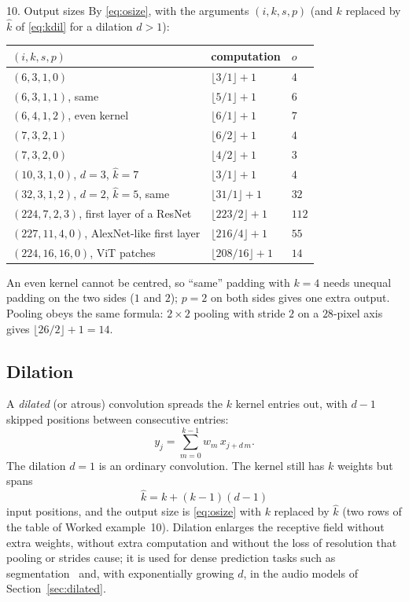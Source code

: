\documentclass[11pt]{article}
\begin{document}
\begin{worked}{10. Output sizes}
By \eqref{eq:osize}, with the arguments $(i, k, s, p)$ (and $k$ replaced by $\hat k$ of \eqref{eq:kdil} for a dilation
$d > 1$):
\begin{center}\small
\begin{tabular}{@{}lll@{}}
\toprule
$(i, k, s, p)$ & computation & $o$ \\
\midrule
$(6, 3, 1, 0)$ & $\lfloor 3/1 \rfloor + 1$ & $4$ \\
$(6, 3, 1, 1)$, same & $\lfloor 5/1 \rfloor + 1$ & $6$ \\
$(6, 4, 1, 2)$, even kernel & $\lfloor 6/1 \rfloor + 1$ & $7$ \\
$(7, 3, 2, 1)$ & $\lfloor 6/2 \rfloor + 1$ & $4$ \\
$(7, 3, 2, 0)$ & $\lfloor 4/2 \rfloor + 1$ & $3$ \\
$(10, 3, 1, 0)$, $d = 3$, $\hat k = 7$ & $\lfloor 3/1 \rfloor + 1$ & $4$ \\
$(32, 3, 1, 2)$, $d = 2$, $\hat k = 5$, same & $\lfloor 31/1 \rfloor + 1$ & $32$ \\
$(224, 7, 2, 3)$, first layer of a ResNet & $\lfloor 223/2 \rfloor + 1$ & $112$ \\
$(227, 11, 4, 0)$, AlexNet-like first layer & $\lfloor 216/4 \rfloor + 1$ & $55$ \\
$(224, 16, 16, 0)$, ViT patches & $\lfloor 208/16 \rfloor + 1$ & $14$ \\
\bottomrule
\end{tabular}
\end{center}
An even kernel cannot be centred, so ``same'' padding with $k = 4$ needs unequal padding on the two sides ($1$ and $2$);
$p = 2$ on both sides gives one extra output. Pooling obeys the same formula: $2 \times 2$ pooling with stride $2$ on a
$28$-pixel axis gives $\lfloor 26/2 \rfloor + 1 = 14$.
\end{worked}

\subsection{Dilation}

A \emph{dilated} (or atrous) convolution spreads the $k$ kernel entries out, with $d - 1$ skipped positions between
consecutive entries:
\[
  y_j = \sum_{m=0}^{k-1} w_m\, x_{j + d\,m} .
\]
The dilation $d = 1$ is an ordinary convolution. The kernel still has $k$ weights but spans
\begin{equation}\label{eq:kdil}
  \hat k = k + (k - 1)(d - 1)
\end{equation}
input positions, and the output size is \eqref{eq:osize} with $k$ replaced by $\hat k$ (two rows of the table of Worked
example~10). Dilation enlarges the receptive field without extra weights, without extra
computation and without the loss of resolution that pooling or strides cause; it is used for dense prediction tasks such
as segmentation~\cite{yu2016} and, with exponentially growing $d$, in the audio models of Section~\ref{sec:dilated}.
\end{document}
